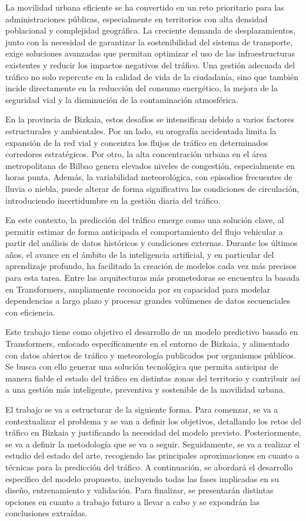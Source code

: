 La movilidad urbana eficiente se ha convertido en un reto prioritario para las administraciones públicas, especialmente en territorios con alta densidad poblacional y complejidad geográfica. La creciente demanda de desplazamientos, junto con la necesidad de garantizar la sostenibilidad del sistema de transporte, exige soluciones avanzadas que permitan optimizar el uso de las infraestructuras existentes y reducir los impactos negativos del tráfico. Una gestión adecuada del tráfico no solo repercute en la calidad de vida de la ciudadanía, sino que también incide directamente en la reducción del consumo energético, la mejora de la seguridad vial y la disminución de la contaminación atmosférica.

En la provincia de Bizkaia, estos desafíos se intensifican debido a varios factores estructurales y ambientales. Por un lado, su orografía accidentada limita la expansión de la red vial y concentra los flujos de tráfico en determinados corredores estratégicos. Por otro, la alta concentración urbana en el área metropolitana de Bilbao genera elevados niveles de congestión, especialmente en horas punta. Además, la variabilidad meteorológica, con episodios frecuentes de lluvia o niebla, puede alterar de forma significativa las condiciones de circulación, introduciendo incertidumbre en la gestión diaria del tráfico.

En este contexto, la predicción del tráfico emerge como una solución clave, al permitir estimar de forma anticipada el comportamiento del flujo vehicular a partir del análisis de datos históricos y condiciones externas. Durante los últimos años, el avance en el ámbito de la inteligencia artificial, y en particular del aprendizaje profundo, ha facilitado la creación de modelos cada vez más precisos para esta tarea. Entre las arquitecturas más prometedoras se encuentra la basada en Transformers, ampliamente reconocida por su capacidad para modelar dependencias a largo plazo y procesar grandes volúmenes de datos secuenciales con eficiencia.

Este trabajo tiene como objetivo el desarrollo de un modelo predictivo basado en Transformers, enfocado específicamente en el entorno de Bizkaia, y alimentado con datos abiertos de tráfico y meteorología publicados por organismos públicos. Se busca con ello generar una solución tecnológica que permita anticipar de manera fiable el estado del tráfico en distintas zonas del territorio y contribuir así a una gestión más inteligente, preventiva y sostenible de la movilidad urbana.

El trabajo se va a estructurar de la siguiente forma. Para comenzar, se va a contextualizar el problema y se van a definir los objetivos, detallando los retos del tráfico en Bizkaia y justificando la necesidad del modelo previsto. Posteriormente, se va a definir la metodología que se va a seguir. Seguidamente, se va a realizar el estudio del estado del arte, recogiendo las principales aproximaciones en cuanto a técnicas para la predicción del tráfico. A continuación, se abordará el desarrollo específico del modelo propuesto, incluyendo todas las fases implicadas en su diseño, entrenamiento y validación. Para finalizar, se presentarán distintas opciones en cuanto a trabajo futuro a llevar a cabo y se expondrán las conclusiones extraídas.

